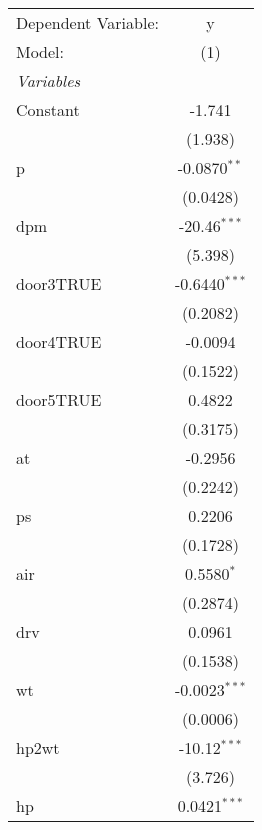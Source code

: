
\begingroup
\centering
\begin{tabular}{lc}
   \tabularnewline \midrule \midrule
   Dependent Variable:            & y\\  
   Model:                         & (1)\\  
   \midrule
   \emph{Variables}\\
   Constant                       & -1.741\\   
                                  & (1.938)\\   
   p                              & -0.0870$^{**}$\\   
                                  & (0.0428)\\   
   dpm                            & -20.46$^{***}$\\   
                                  & (5.398)\\   
   door3TRUE                      & -0.6440$^{***}$\\   
                                  & (0.2082)\\   
   door4TRUE                      & -0.0094\\   
                                  & (0.1522)\\   
   door5TRUE                      & 0.4822\\   
                                  & (0.3175)\\   
   at                             & -0.2956\\   
                                  & (0.2242)\\   
   ps                             & 0.2206\\   
                                  & (0.1728)\\   
   air                            & 0.5580$^{*}$\\   
                                  & (0.2874)\\   
   drv                            & 0.0961\\   
                                  & (0.1538)\\   
   wt                             & -0.0023$^{***}$\\   
                                  & (0.0006)\\   
   hp2wt                          & -10.12$^{***}$\\   
                                  & (3.726)\\   
   hp                             & 0.0421$^{***}$\\   

\end{tabular}
